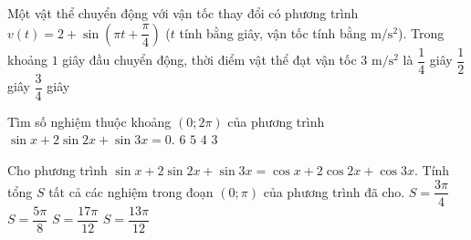 \begin{ex}%
	Một vật thể chuyển động với vận tốc thay đổi có phương trình  $v(t) = 2+\sin\left(\pi t +\dfrac{\pi}{4}\right)$  ($t$ tính bằng giây, vận tốc tính bằng $\mathrm{m/s^2}$).
	Trong khoảng $1$ giây đầu chuyển động, thời  điểm vật thể đạt vận tốc $3$ $\mathrm{m/s^2}$ là 
	{\True $\dfrac{1}{4}$ giây}
	{$\dfrac{1}{2}$ giây}
	{$\dfrac{3}{4}$ giây}
\end{ex}
\begin{ex}%
	Tìm số nghiệm thuộc khoảng $(0;2\pi)$ của phương trình $\sin x + 2\sin2x + \sin3x=0.$
	\choice
	{$6$}
	{$5$}
	{$4$}
	{\True $3$}
\end{ex}
\begin{ex}%
	Cho phương trình $\sin x + 2\sin 2x+\sin 3x = \cos x+2\cos 2x + \cos3x.$ Tính tổng $S$ tất cả các nghiệm trong đoạn $(0;\pi)$ của phương trình đã cho.
	\choice
	{\True $S=\dfrac{3\pi}{4}$}
	{$S=\dfrac{5\pi}{8}$}
	{$S=\dfrac{17\pi}{12}$}
	{$S=\dfrac{13\pi}{12}$}
\end{ex}
